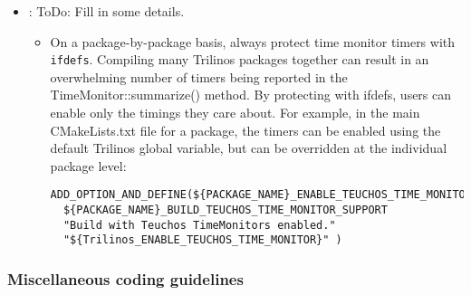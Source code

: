 \begin{itemize}
\begin{itemize}
  \end{itemize}

\item\GCGTeuchosTimers: ToDo: Fill in some details.
  \begin{itemize}
  
  \item On a package-by-package basis, always protect time monitor timers with {}\texttt{ifdefs}.  Compiling many Trilinos packages together can result in an overwhelming number of timers being reported in the TimeMonitor::summarize() method.  By protecting with ifdefs, users can enable only the timings they care about.  For example, in the main CMakeLists.txt file for a package, the timers can be enabled using the default Trilinos global variable, but can be overridden at the individual package level:

{\small\begin{verbatim}
ADD_OPTION_AND_DEFINE(${PACKAGE_NAME}_ENABLE_TEUCHOS_TIME_MONITOR
  ${PACKAGE_NAME}_BUILD_TEUCHOS_TIME_MONITOR_SUPPORT
  "Build with Teuchos TimeMonitors enabled."
  "${Trilinos_ENABLE_TEUCHOS_TIME_MONITOR}" )
\end{verbatim}}

  \end{itemize}

\end{itemize}


%
\subsubsection{Miscellaneous coding guidelines}
%

